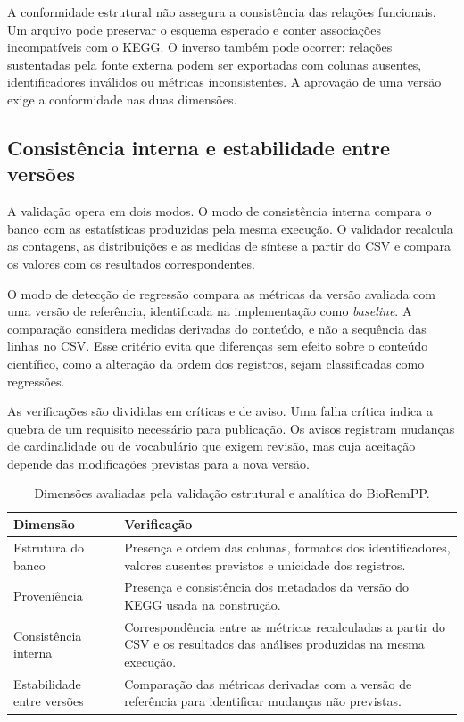 A conformidade estrutural não assegura a consistência das relações funcionais.
Um arquivo pode preservar o esquema esperado e conter associações
incompatíveis com o KEGG. O inverso também pode ocorrer: relações sustentadas
pela fonte externa podem ser exportadas com colunas ausentes, identificadores
inválidos ou métricas inconsistentes. A aprovação de uma versão exige a
conformidade nas duas dimensões.

\subsection{Consistência interna e estabilidade entre versões}

A validação opera em dois modos. O modo de consistência interna
compara o banco com as estatísticas produzidas pela mesma execução. O
validador recalcula as contagens, as distribuições e as medidas de síntese a
partir do CSV e compara os valores com os resultados correspondentes.

O modo de detecção de regressão compara as métricas da versão avaliada com uma
versão de referência, identificada na implementação como
\textit{baseline}. A comparação considera medidas derivadas do conteúdo, e
não a sequência das linhas no CSV. Esse critério evita que diferenças sem
efeito sobre o conteúdo científico, como a alteração da ordem dos registros,
sejam classificadas como regressões.

As verificações são divididas em críticas e de aviso. Uma falha crítica indica
a quebra de um requisito necessário para publicação. Os avisos registram
mudanças de cardinalidade ou de vocabulário que exigem revisão, mas cuja
aceitação depende das modificações previstas para a nova versão.

\begin{table}[htbp]
\centering
\caption{Dimensões avaliadas pela validação estrutural e analítica do
BioRemPP.}
\label{tab:c1-validation-dimensions}
\small
\begin{tabularx}{\textwidth}{@{}lX@{}}
\toprule
\textbf{Dimensão} & \textbf{Verificação} \\
\midrule

Estrutura do banco
& Presença e ordem das colunas, formatos dos identificadores, valores
ausentes previstos e unicidade dos registros. \\

Proveniência
& Presença e consistência dos metadados da versão do KEGG usada na
construção. \\

Consistência interna
& Correspondência entre as métricas recalculadas a partir do CSV e os
resultados das análises produzidas na mesma execução. \\

Estabilidade entre versões
& Comparação das métricas derivadas com a versão de referência para
identificar mudanças não previstas. \\

\bottomrule
\end{tabularx}
\end{table}

